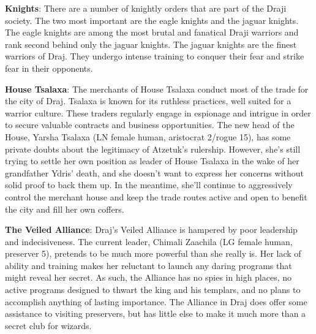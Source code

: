 {
	\textbf{Knights}: There are a number of knightly orders that are part of the Draji society. The two most important are the eagle knights and the jaguar knights. The eagle knights are among the most brutal and fanatical Draji warriors and rank second behind only the jaguar knights. The jaguar knights are the finest warriors of Draj. They undergo intense training to conquer their fear and strike fear in their opponents.

	\textbf{House Tsalaxa}: The merchants of House Tsalaxa conduct most of the trade for the city of Draj. Tsalaxa is known for its ruthless practices, well suited for a warrior culture. These traders regularly engage in espionage and intrigue in order to secure valuable contracts and business opportunities. The new head of the House, Yarsha Tsalaxa (LN female human, aristocrat 2/rogue 15), has some private doubts about the legitimacy of Atzetuk's rulership. However, she's still trying to settle her own position as leader of House Tsalaxa in the wake of her grandfather Ydris' death, and she doesn't want to express her concerns without solid proof to back them up. In the meantime, she'll continue to aggressively control the merchant house and keep the trade routes active and open to benefit the city and fill her own coffers.

	\textbf{The Veiled Alliance}: Draj's Veiled Alliance is hampered by poor leadership and indecisiveness. The current leader, Chimali Zaachila (LG female human, preserver 5), pretends to be much more powerful than she really is. Her lack of ability and training makes her reluctant to launch any daring programs that might reveal her secret. As such, the Alliance has no spies in high places, no active programs designed to thwart the king and his templars, and no plans to accomplish anything of lasting importance. The Alliance in Draj does offer some assistance to visiting preservers, but has little else to make it much more than a secret club for wizards.
}
